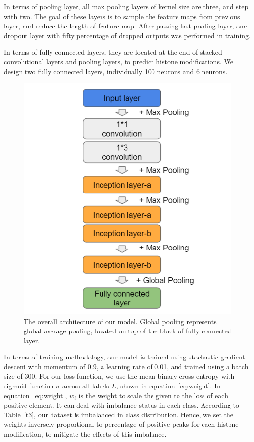 In terms of pooling layer, all max pooling layers of kernel size are three, and step with two. The goal of these layers is to sample the feature maps from previous layer, and reduce the length of feature map. After passing last pooling layer, one dropout layer with fifty percentage of dropped outputs was performed in training.

In terms of fully connected layers, they are located at the end of stacked convolutional layers and pooling layers, to predict histone modifications. We design two fully connected layers, individually 100 neurons and 6 neurons.

\begin{figure}[H]
    \centering
    \includegraphics[width=0.7\columnwidth]{body/figure/figure12.png}
    \captionsetup{labelfont=bf}
    \renewcommand{\baselinestretch}{1.0}
    \caption[Complete architecture]{The overall architecture of our model. Global pooling represents global average pooling, located on top of the block of fully connected layer.}
    \label{f12}
\end{figure}

In terms of training methodology, our model is trained using stochastic gradient descent with momentum of 0.9, a learning rate of 0.01, and trained using a batch size of 300. For our loss function, we use the mean binary cross-entropy with sigmoid function \(\sigma\) across all labels $L$, shown in equation~\ref{eq:weight}.  In equation~\ref{eq:weight}, $w_\ell$ is the weight to scale the given to the loss of each positive element. It can deal with imbalance status in each class. According to Table~\ref{t3}, our dataset is imbalanced in class distribution. Hence, we set the weights inversely proportional to percentage of positive peaks for each histone modification, to mitigate the effects of this imbalance.

